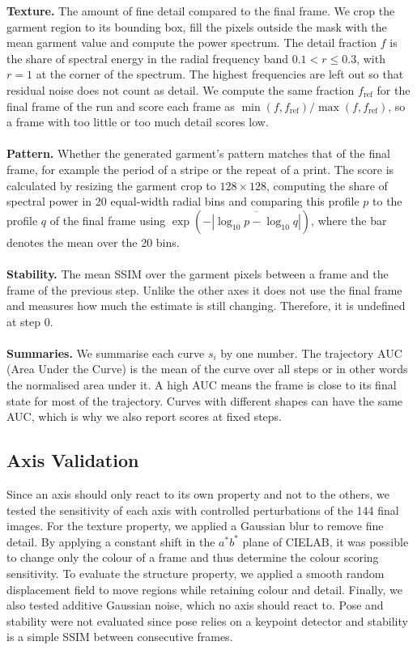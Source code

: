 \textbf{Texture.} The amount of fine detail compared to the final frame. We crop the garment region to its bounding box, fill the pixels outside the mask with the mean garment value and compute the power spectrum. The detail fraction $f$ is the share of spectral energy in the radial frequency band $0.1 < r \leq 0.3$, with $r = 1$ at the corner of the spectrum. The highest frequencies are left out so that residual noise does not count as detail. We compute the same fraction $f_{\text{ref}}$ for the final frame of the run and score each frame as $\min(f, f_{\text{ref}})/\max(f, f_{\text{ref}})$, so a frame with too little or too much detail scores low.
\\ \\
\textbf{Pattern.} Whether the generated garment's pattern matches that of the final frame, for example the period of a stripe or the repeat of a print. The score is calculated by resizing the garment crop to $128 \times 128$, computing the share of spectral power in 20 equal-width radial bins and comparing this profile $p$ to the profile $q$ of the final frame using $\exp(-\overline{|\log_{10} p - \log_{10} q|})$, where the bar denotes the mean over the 20 bins.
\\ \\
\textbf{Stability.} The mean SSIM over the garment pixels between a frame and the frame of the previous step. Unlike the other axes it does not use the final frame and measures how much the estimate is still changing. Therefore, it is undefined at step 0.
\\ \\
\textbf{Summaries.} We summarise each curve $s_i$ by one number. The trajectory AUC (Area Under the Curve) is the mean of the curve over all steps or in other words the normalised area under it. A high AUC means the frame is close to its final state for most of the trajectory. Curves with different shapes can have the same AUC, which is why we also report scores at fixed steps.

\subsection{Axis Validation}
\label{sec:validation}
Since an axis should only react to its own property and not to the others, we tested the sensitivity of each axis with controlled perturbations of the 144 final images. For the texture property, we applied a Gaussian blur to remove fine detail. By applying a constant shift in the $a^*b^*$ plane of CIELAB, it was possible to change only the colour of a frame and thus determine the colour scoring sensitivity. To evaluate the structure property, we applied a smooth random displacement field to move regions while retaining colour and detail. Finally, we also tested additive Gaussian noise, which no axis should react to. Pose and stability were not evaluated since pose relies on a keypoint detector and stability is a simple SSIM between consecutive frames.

